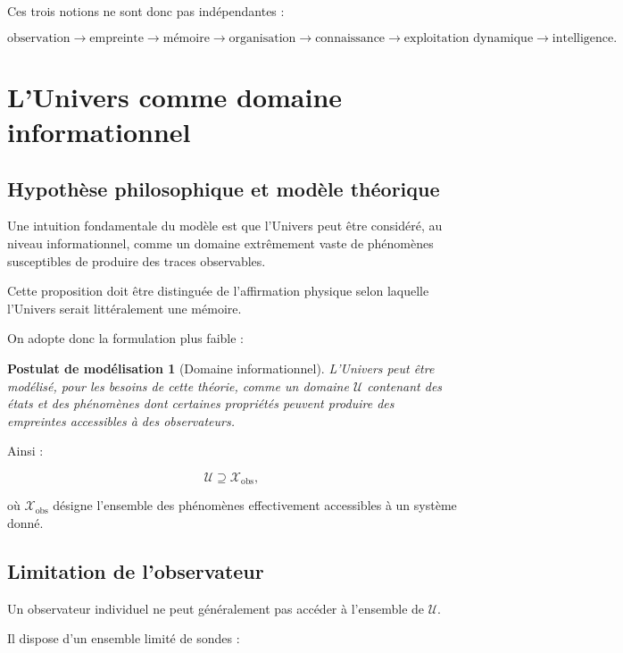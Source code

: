 \documentclass[11pt,a4paper]{article}
\newtheorem{assumption}[definition]{Postulat de modélisation}
\newcommand{\X}{\mathcal X}
\begin{document}
Ces trois notions ne sont donc pas indépendantes :

\[
\boxed{
\text{observation}
\rightarrow
\text{empreinte}
\rightarrow
\text{mémoire}
\rightarrow
\text{organisation}
\rightarrow
\text{connaissance}
\rightarrow
\text{exploitation dynamique}
\rightarrow
\text{intelligence}.
}
\]

\section{L'Univers comme domaine informationnel}

\subsection{Hypothèse philosophique et modèle théorique}

Une intuition fondamentale du modèle est que l'Univers peut être considéré,
au niveau informationnel, comme un domaine extrêmement vaste de phénomènes
susceptibles de produire des traces observables.

Cette proposition doit être distinguée de l'affirmation physique selon
laquelle l'Univers serait littéralement une mémoire.

On adopte donc la formulation plus faible :

\begin{assumption}[Domaine informationnel]
L'Univers peut être modélisé, pour les besoins de cette théorie, comme un
domaine $\mathcal U$ contenant des états et des phénomènes dont certaines
propriétés peuvent produire des empreintes accessibles à des observateurs.
\end{assumption}

Ainsi :

\[
\mathcal U
\supseteq
\X_{\mathrm{obs}},
\]

où $\X_{\mathrm{obs}}$ désigne l'ensemble des phénomènes effectivement
accessibles à un système donné.

\subsection{Limitation de l'observateur}

Un observateur individuel ne peut généralement pas accéder à l'ensemble
de $\mathcal U$.

Il dispose d'un ensemble limité de sondes :
\end{document}

